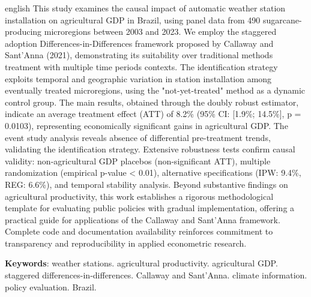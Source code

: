 \documentclass[
	12pt,				%
	oneside,			%
	a4paper,			%
	english,			%
	french,				%
	spanish,			%
	brazil				%
	]{abntex2}
\begin{document}
\begin{resumo}[Abstract]
 \begin{otherlanguage*}{english}
This study examines the causal impact of automatic weather station installation on agricultural GDP in Brazil, using panel data from 490 sugarcane-producing microregions between 2003 and 2023. We employ the staggered adoption Differences-in-Differences framework proposed by Callaway and Sant'Anna (2021), demonstrating its suitability over traditional methods treatment with multiple time periods contexts. The identification strategy exploits temporal and geographic variation in station installation among eventually treated microregions, using the "not-yet-treated" method as a dynamic control group. The main results, obtained through the doubly robust estimator, indicate an average treatment effect (ATT) of 8.2\% (95\% CI: [1.9\%; 14.5\%], p = 0.0103), representing economically significant gains in agricultural GDP. The event study analysis reveals absence of differential pre-treatment trends, validating the identification strategy. Extensive robustness tests confirm causal validity: non-agricultural GDP placebos (non-significant ATT), multiple randomization (empirical p-value < 0.01), alternative specifications (IPW: 9.4\%, REG: 6.6\%), and temporal stability analysis. Beyond substantive findings on agricultural productivity, this work establishes a rigorous methodological template for evaluating public policies with gradual implementation, offering a practical guide for applications of the Callaway and Sant'Anna framework. Complete code and documentation availability reinforces commitment to transparency and reproducibility in applied econometric research.

   \textbf{Keywords}: weather stations. agricultural productivity. agricultural GDP. staggered differences-in-differences. Callaway and Sant'Anna. climate information. policy evaluation. Brazil.
 \end{otherlanguage*}
\end{resumo}

\listoffigures*
\cleardoublepage

\listoftables*
\cleardoublepage

\tableofcontents*
\cleardoublepage

\textual
\end{document}
